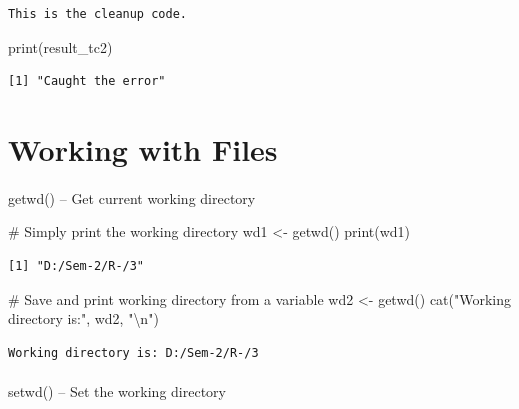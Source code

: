 \documentclass[
  letterpaper,
  DIV=11,
  numbers=noendperiod]{scrartcl}
\makeatletter
\let\oldparagraph\paragraph
\renewcommand{\paragraph}{
    \@ifstar
      \xxxParagraphStar
      \xxxParagraphNoStar
  }
\newcommand{\xxxParagraphStar}[1]{\oldparagraph*{#1}\mbox{}}
\newcommand{\xxxParagraphNoStar}[1]{\oldparagraph{#1}\mbox{}}
\newenvironment{Shaded}{\begin{snugshade}}{\end{snugshade}}
\newcommand{\CommentTok}[1]{\textcolor[rgb]{0.37,0.37,0.37}{#1}}
\newcommand{\FunctionTok}[1]{\textcolor[rgb]{0.28,0.35,0.67}{#1}}
\newcommand{\NormalTok}[1]{\textcolor[rgb]{0.00,0.23,0.31}{#1}}
\newcommand{\OtherTok}[1]{\textcolor[rgb]{0.00,0.23,0.31}{#1}}
\newcommand{\SpecialCharTok}[1]{\textcolor[rgb]{0.37,0.37,0.37}{#1}}
\newcommand{\StringTok}[1]{\textcolor[rgb]{0.13,0.47,0.30}{#1}}
\makeatother
\begin{document}
\begin{verbatim}
This is the cleanup code.
\end{verbatim}

\begin{Shaded}
\begin{Highlighting}[]
\FunctionTok{print}\NormalTok{(result\_tc2)}
\end{Highlighting}
\end{Shaded}

\begin{verbatim}
[1] "Caught the error"
\end{verbatim}

\section{Working with Files}\label{5-working-with-files}

\paragraph{getwd() -- Get current working
directory}\label{getwd-get-current-working-directory}

\begin{Shaded}
\begin{Highlighting}[]
\CommentTok{\#   Simply print the working directory}
\NormalTok{wd1 }\OtherTok{\textless{}{-}} \FunctionTok{getwd}\NormalTok{()}
\FunctionTok{print}\NormalTok{(wd1)}
\end{Highlighting}
\end{Shaded}

\begin{verbatim}
[1] "D:/Sem-2/R-/3"
\end{verbatim}

\begin{Shaded}
\begin{Highlighting}[]
\CommentTok{\#   Save and print working directory from a variable}
\NormalTok{wd2 }\OtherTok{\textless{}{-}} \FunctionTok{getwd}\NormalTok{()}
\FunctionTok{cat}\NormalTok{(}\StringTok{"Working directory is:"}\NormalTok{, wd2, }\StringTok{"}\SpecialCharTok{\textbackslash{}n}\StringTok{"}\NormalTok{)}
\end{Highlighting}
\end{Shaded}

\begin{verbatim}
Working directory is: D:/Sem-2/R-/3 
\end{verbatim}

\paragraph{setwd() -- Set the working
directory}\label{setwd-set-the-working-directory}
\end{document}

